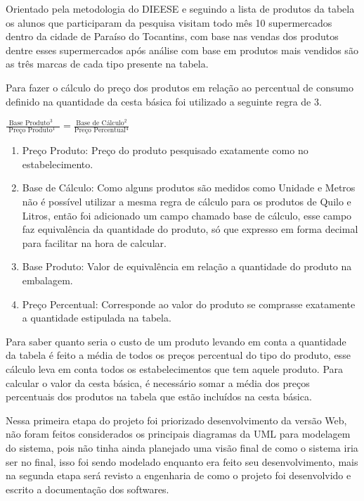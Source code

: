 \documentclass{ifto-tex}
\begin{document}
Orientado pela metodologia do DIEESE e seguindo a lista de produtos da tabela os alunos que participaram da pesquisa visitam todo mês 10 supermercados dentro da cidade de Paraíso do Tocantins, com base nas vendas dos produtos dentre esses supermercados após análise com base em produtos mais vendidos são as três marcas de cada tipo presente na tabela.

Para fazer o cálculo do preço dos produtos em relação ao percentual de consumo definido na quantidade da cesta básica foi utilizado a seguinte regra de 3.

\begin{center}	
$\displaystyle\frac{\mbox {Base Produto$^{3}$ }}{\mbox { Preço Produto$^{1}$ }}=\frac{\mbox {Base de Cálculo$^{2}$} }{\mbox {Preço Percentual$^{4}$}}$
\end{center}
	
	\begin{enumerate}
	\item Preço Produto: Preço do produto pesquisado exatamente como no estabelecimento.
	\item Base de Cálculo: Como alguns produtos são medidos como Unidade e Metros não é possível utilizar a mesma regra de cálculo para os produtos de Quilo e Litros, então foi adicionado um campo chamado base de cálculo, esse campo faz equivalência da quantidade do produto, só que expresso em forma decimal para facilitar na hora de calcular.
	\item Base Produto: Valor de equivalência em relação a quantidade do produto na embalagem.
	\item Preço Percentual: Corresponde ao valor do produto se comprasse exatamente a quantidade estipulada na tabela.
	
\end{enumerate}

	Para saber quanto seria o custo de um produto levando em conta a quantidade da tabela é feito a média de todos os preços percentual do tipo do produto, esse cálculo leva em conta todos os estabelecimentos que tem aquele produto. Para calcular o valor da cesta básica, é necessário somar a média dos preços percentuais dos produtos na tabela que estão incluídos na cesta básica.
	
	Nessa primeira etapa do projeto foi priorizado desenvolvimento da versão Web, não foram feitos considerados os principais diagramas da UML para modelagem do sistema, pois não tinha ainda planejado uma visão final de como o sistema iria ser no final, isso foi sendo modelado enquanto era feito seu desenvolvimento, mais na segunda etapa será revisto a engenharia de como o projeto foi desenvolvido e escrito a documentação dos softwares.
	
\end{document}
